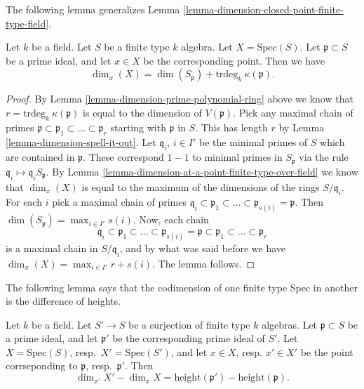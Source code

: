 \noindent
The following lemma generalizes
Lemma \ref{lemma-dimension-closed-point-finite-type-field}.

\begin{lemma}
\label{lemma-dimension-at-a-point-finite-type-field}
Let $k$ be a field.
Let $S$ be a finite type $k$ algebra.
Let $X = \text{Spec}(S)$.
Let $\mathfrak p \subset S$ be a prime ideal,
and let $x \in X$ be the corresponding point.
Then we have
$$
\dim_x(X) = \dim(S_{\mathfrak p}) + \text{trdeg}_k\ \kappa(\mathfrak p).
$$
\end{lemma}

\begin{proof}
By Lemma \ref{lemma-dimension-prime-polynomial-ring} above we know that 
$r = \text{trdeg}_k\ \kappa(\mathfrak p)$ is equal to the
dimension of $V(\mathfrak p)$.
Pick any maximal chain of primes
$\mathfrak p \subset \mathfrak p_1 \subset \ldots \subset \mathfrak p_r$
starting with $\mathfrak p$ in $S$.
This has length $r$ by Lemma \ref{lemma-dimension-spell-it-out}.
Let $\mathfrak q_i$, $i \in I'$ be the minimal
primes of $S$ which are contained in $\mathfrak p$.
These correspond $1-1$ to minimal primes in $S_{\mathfrak p}$
via the rule $\mathfrak q_i \mapsto \mathfrak q_iS_{\mathfrak p}$.
By Lemma \ref{lemma-dimension-at-a-point-finite-type-over-field}
we know that $\dim_x(X)$ is equal
to the maximum of the dimensions of the rings $S/\mathfrak q_i$.
For each $i$ pick a maximal chain of primes
$\mathfrak q_i \subset \mathfrak p_1 \subset \ldots \subset \mathfrak p_{s(i)} = \mathfrak p$. 
Then $\dim(S_{\mathfrak p}) = \max_{i \in I'} s(i)$.
Now, each chain
$$
\mathfrak q_i \subset \mathfrak p_1 \subset \ldots \subset
\mathfrak p_{s(i)} = \mathfrak p \subset
\mathfrak p_1 \subset \ldots \subset \mathfrak p_r
$$
is a maximal chain in $S/\mathfrak q_i$, and by what was said
before we have
$\dim_x(X) = \max_{i \in I'} r + s(i)$.
The lemma follows.
\end{proof}

\noindent
The following lemma says that the codimension of one finite type
Spec in another is the difference of heights.

\begin{lemma}
\label{lemma-codimension}
Let $k$ be a field.
Let $S' \to S$ be a surjection of finite type $k$ algebras.
Let $\mathfrak p \subset S$ be a prime ideal,
and let $\mathfrak p'$ be the corresponding prime ideal of $S'$.
Let $X = \text{Spec}(S)$, resp.\ $X' = \text{Spec}(S')$,
and let $x \in X$, resp. $x'\in X'$ be the point corrseponding
to $\mathfrak p$, resp.\ $\mathfrak p'$.
Then
$$
\dim_{x'} X' - \dim_x X =
\text{height}(\mathfrak p') - \text{height}(\mathfrak p).
$$
\end{lemma}

